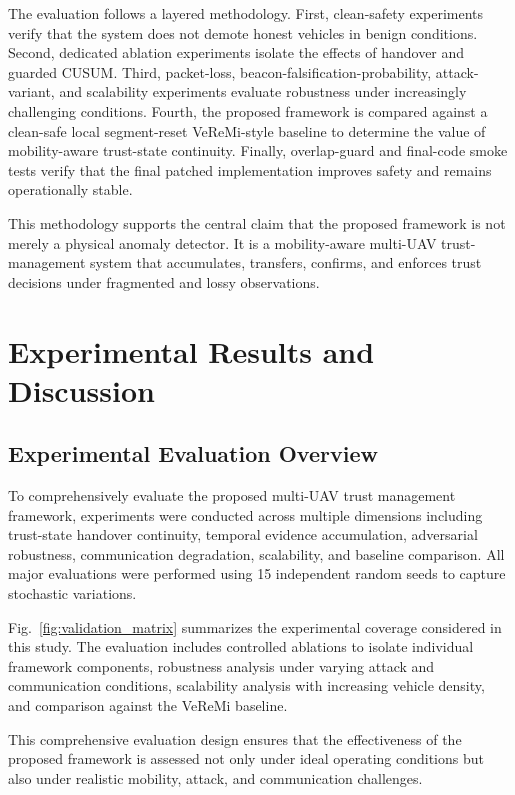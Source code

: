 \documentclass[journal]{IEEEtran}
\begin{document}
The evaluation follows a layered methodology. First, clean-safety experiments verify that the system does not demote honest vehicles in benign conditions. Second, dedicated ablation experiments isolate the effects of handover and guarded CUSUM. Third, packet-loss, beacon-falsification-probability, attack-variant, and scalability experiments evaluate robustness under increasingly challenging conditions. Fourth, the proposed framework is compared against a clean-safe local segment-reset VeReMi-style baseline to determine the value of mobility-aware trust-state continuity. Finally, overlap-guard and final-code smoke tests verify that the final patched implementation improves safety and remains operationally stable.

This methodology supports the central claim that the proposed framework is not merely a physical anomaly detector. It is a mobility-aware multi-UAV trust-management system that accumulates, transfers, confirms, and enforces trust decisions under fragmented and lossy observations.

\FloatBarrier
\section{Experimental Results and Discussion}
\label{sec:results}

\subsection{Experimental Evaluation Overview}

To comprehensively evaluate the proposed multi-UAV trust management
framework, experiments were conducted across multiple dimensions including
trust-state handover continuity, temporal evidence accumulation, adversarial
robustness, communication degradation, scalability, and baseline comparison.
All major evaluations were performed using 15 independent random seeds to
capture stochastic variations.

Fig.~\ref{fig:validation_matrix} summarizes the experimental
coverage considered in this study. The evaluation includes controlled
ablations to isolate individual framework components, robustness analysis
under varying attack and communication conditions, scalability analysis with
increasing vehicle density, and comparison against the VeReMi baseline.

This comprehensive evaluation design ensures that the effectiveness of the
proposed framework is assessed not only under ideal operating conditions but
also under realistic mobility, attack, and communication challenges.
\end{document}
